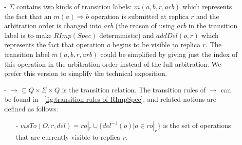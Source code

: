 \begin{itemize}
\item[-] $\Sigma$ contains two kinds of transition labels: $m(a,b,r,\mathit{arb})$ which represents the fact that an $m(a) \Rightarrow b$ operation is submitted at replica $r$ and the arbitration order is changed into $\mathit{arb}$ (the reason of using $\mathit{arb}$ in the transition label is to make $\mathit{RImp}(\mathit{Spec})$ deterministic) and $\mathit{addDel}(o,r)$ which represents the fact that operation $o$ begins to be visible to replica $r$. The transition label $m(a,b,r,\mathit{arb})$ could be simplified by giving just the index of this operation in the arbitration order instead of the full arbitration. We prefer this version to simplify the technical exposition.


\item[-] $\rightarrow \subseteq Q \times \Sigma \times Q$ is the transition relation. The transition rules of $\rightarrow$ can be found in \figurename~\ref{fig:transition rules of RImpSpec}, and related notions are defined as follows:


    \begin {itemize}
    
    
    \item[-] $\mathit{visTo}(O,r,\mathit{del}) = \mathit{ro}|_r\cup \{ \mathit{del}^{-1}(o) \vert o \in \mathit{ro}|_r \} $ is the set of operations that are currently visible to replica $r$. 



\end{itemize}
\end{itemize}
